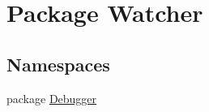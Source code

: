 \hypertarget{namespace_watcher}{\section{Package Watcher}
\label{namespace_watcher}
}
\subsection*{Namespaces}
\begin{DoxyCompactItemize}
\item 
package \hyperlink{namespace_watcher_1_1_debugger}{Debugger}
\end{DoxyCompactItemize}
